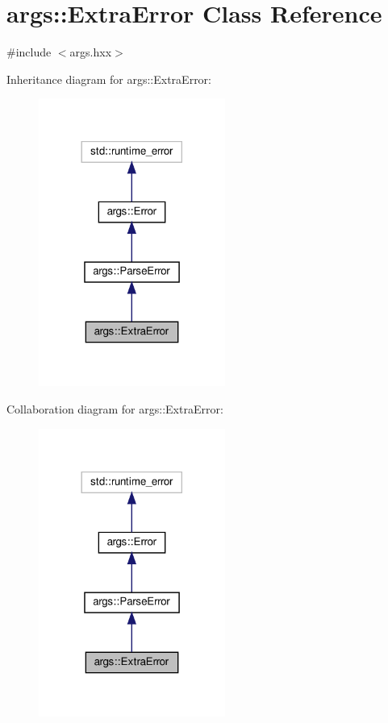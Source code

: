 \hypertarget{classargs_1_1_extra_error}{}\section{args\+:\+:Extra\+Error Class Reference}
\label{classargs_1_1_extra_error}


{\ttfamily \#include $<$args.\+hxx$>$}



Inheritance diagram for args\+:\+:Extra\+Error\+:\nopagebreak
\begin{figure}[H]
\begin{center}
\leavevmode
\includegraphics[width=173pt]{classargs_1_1_extra_error__inherit__graph}
\end{center}
\end{figure}


Collaboration diagram for args\+:\+:Extra\+Error\+:\nopagebreak
\begin{figure}[H]
\begin{center}
\leavevmode
\includegraphics[width=173pt]{classargs_1_1_extra_error__coll__graph}
\end{center}
\end{figure}

